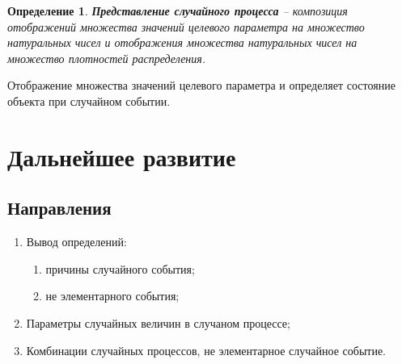 \documentclass[a4paper,11pt]{report}
\newtheorem{definition}{Определение}
\begin{document}
      \begin{definition}
        \textbf{Представление случайного процесса} -- композиция отображений множества значений целевого параметра на множество натуральных чисел и отображения множества натуральных чисел на множество плотностей распределения.
      \end{definition}
        
      Отображение множества значений целевого параметра и определяет состояние объекта при случайном событии.
        
        
        
  \chapter{Дальнейшее развитие}
  
    \section{Направления}
      
      \begin{enumerate}
      	\item Вывод определений:
    	    \begin{enumerate}
      	  	\item причины случайного события;
      	  	\item не элементарного события;
          \end{enumerate}
      	\item Параметры случайных величин в случаном процессе;
      	\item Комбинации случайных процессов, не элементарное случайное событие.
      \end{enumerate}
  
\end{document}
